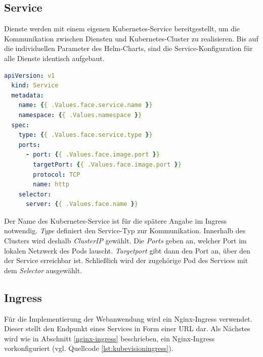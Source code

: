 \subsection{Service}
Dienste werden mit einem eigenen Kubernetes-Service bereitgestellt, um die Kommunikation zwischen Diensten und Kubernetes-Cluster zu realisieren.
Bis auf die individuellen Parameter des Helm-Charts, sind die Service-Konfiguration für alle Dienste identisch aufgebaut.

\begin{lstlisting}[caption={face-service.yaml},captionpos=b,label={lst:face-service},language=yaml,float,floatplacement=H]
  apiVersion: v1
  kind: Service
  metadata:
    name: {{ .Values.face.service.name }}
    namespace: {{ .Values.namespace }}
  spec:
    type: {{ .Values.face.service.type }}
    ports:
      - port: {{ .Values.face.image.port }}
        targetPort: {{ .Values.face.image.port }}
        protocol: TCP
        name: http
    selector:
      server: {{ .Values.face.name }}

\end{lstlisting}

Der Name des Kubernetes-Service ist für die spätere Angabe im Ingress notwendig.
\textit{Type} definiert den Service-Typ zur Kommunikation. 
Innerhalb des Clusters wird deshalb \textit{ClusterIP} gewählt.
Die \textit{Ports} geben an, welcher Port im lokalen Netzwerk des Pods lauscht.
\textit{Targetport} gibt dann den Port an, über den der Service erreichbar ist.
Schließlich wird der zugehörige Pod des Services mit dem \textit{Selector} ausgewählt.


\subsection{Ingress}

Für die Implementierung der Webanwendung wird ein Nginx-Ingress verwendet.
Dieser stellt den Endpunkt eines Services in Form einer URL dar.
Als Nächstes wird wie in Abschnitt \ref{nginx-ingress} beschrieben, ein Nginx-Ingress vorkonfiguriert (vgl. Quellcode \ref{lst:kubevisioningress}).


